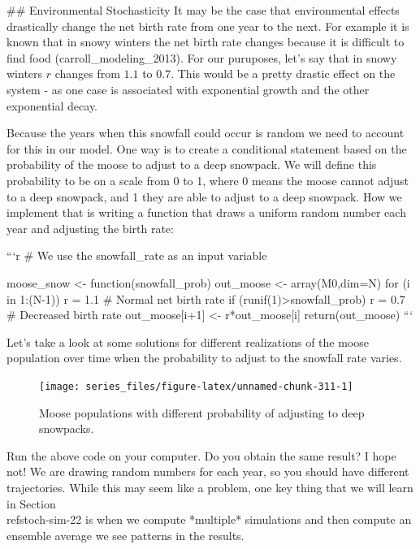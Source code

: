 \documentclass[
]{book}
\theoremstyle{definition}
\theoremstyle{definition}
\theoremstyle{definition}
\theoremstyle{remark}
\begin{document}
## Environmental Stochasticity
It may be the case that environmental effects drastically change the net birth rate from one year to the next.  For example it is known that in snowy winters the net birth rate changes because it is difficult to find food \@ref(carroll_modeling_2013). For our puruposes, let's say that in snowy winters $r$ changes from $1.1$ to $0.7$.  This would be a pretty drastic effect on the system - as one case is associated with exponential growth and the other exponential decay.

Because the years when this snowfall could occur is random we need to account for this in our model.  One way is to create a conditional statement based on the probability of the moose to adjust to a deep snowpack. We will define this probability to be on a scale from 0 to 1, where 0 means the moose cannot adjust to a deep snowpack, and 1 they are able to adjust to a deep snowpack. How we implement that is writing a function that draws a uniform random number each year and adjusting the birth rate:



```r
# We use the snowfall_rate  as an input variable

moose_snow <- function(snowfall_prob) {
    out_moose <- array(M0,dim=N)
      for (i in 1:(N-1)) {
        r = 1.1  # Normal net birth rate
        if (runif(1)>snowfall_prob) {
          r = 0.7   # Decreased birth rate
        }
        out_moose[i+1] <- r*out_moose[i]
      }
  return(out_moose)
  }
```



Let's take a look at some solutions for different realizations of the moose population over time when the probability to adjust to the snowfall rate varies.

\begin{figure}

{\centering \texttt{[image: series\_files/figure-latex/unnamed-chunk-311-1]} 

}

\caption{Moose populations with different probability of adjusting to deep snowpacks.}\label{fig:unnamed-chunk-311}
\end{figure}

Run the above code on your computer. Do you obtain the same result? I hope not! We are drawing random numbers for each year, so you should have different trajectories.  While this may seem like a problem, one key thing that we will learn in Section \\ref{stoch-sim-22} is when we compute *multiple* simulations and then compute an ensemble average we see patterns in the results.
\end{document}
